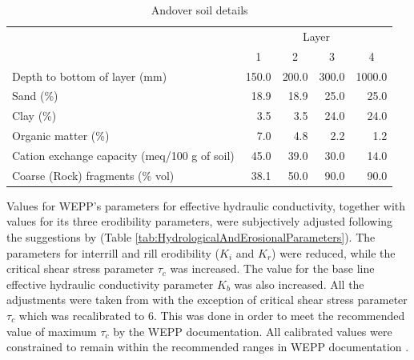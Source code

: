 \begin{table}[htbp]
  \centering
  \caption[Andover soil details]{Andover soil details
\citep[From][]{favis-mortlock1998-141}}
  \label{tab:AndoverSoilDetails}
    \small
    \begin{tabular}{lrrrr}\toprule
    & \multicolumn{4}{c}{Layer}\\
    \cmidrule{2-5}
    & \multicolumn{1}{c}{1} & \multicolumn{1}{c}{2} &
\multicolumn{1}{c}{3} & \multicolumn{1}{c}{4}\\
    \midrule
    Depth to bottom of layer (mm) & 150.0 & 200.0 & 300.0 & 1000.0\\
    Sand (\%) & 18.9 & 18.9 & 25.0 & 25.0\\
    Clay (\%) & 3.5 & 3.5 & 24.0 & 24.0\\
    Organic matter (\%) & 7.0 & 4.8 & 2.2 & 1.2\\
    Cation exchange capacity (meq/100 g of soil) & 45.0 & 39.0 &
30.0 & 14.0\\
    Coarse (Rock) fragments (\% vol) & 38.1 & 50.0 & 90.0 & 90.0\\
    \bottomrule
    \end{tabular}
\end{table}

Values for WEPP's parameters for effective hydraulic conductivity, together with
values for its three erodibility parameters, were subjectively adjusted
following the suggestions by \citet{favis-mortlock1998-141} (Table
\ref{tab:HydrologicalAndErosionalParameters}). The parameters for interrill and
rill erodibility ($K_i$ and $K_r$) were reduced, while the critical shear stress
parameter $\tau_c$ was increased. The value for the base line effective
hydraulic conductivity parameter $K_b$ was also increased. All the adjustments
were taken from \citet{favis-mortlock1998-141} with the exception of critical
shear stress parameter $\tau_c$ which was recalibrated to 6. This was done in
order to meet the recommended value of maximum  $\tau_c$ by the WEPP
documentation. All calibrated values were constrained to remain within the
recommended ranges in WEPP documentation \citep{flanagan1995-usda}.

